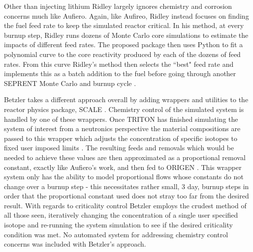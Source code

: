 Other than
injecting lithium Ridley largely ignores chemistry and corrosion concerns much
like Aufiero. Again, like Aufireo, Ridley instead focuses on finding the fuel
feed rate to keep the simulated reactor critical. In his method, at every
burnup step, Ridley runs dozens of Monte Carlo core simulations to estimate
the impacts of different feed rates. The proposed package then uses Python to
fit a polynomial curve to the core reactivity produced by each of the dozens
of feed rates. From this curve Ridley's method then selects the ``best" feed
rate and implements this as a batch addition to the fuel before going through
another SEPRENT Monte Carlo and burnup cycle \cite{Ridley}. 

Betzler takes a different approach overall by adding wrappers and utilities
to the reactor physics package, SCALE \cite{Betzler} \cite{SCALE}. 
Chemistry control of the simulated
system is handled by one of these wrappers. Once TRITON has finished simulating
the system of interest from a neutronics perspective the material compositions
are passed to this wrapper which adjusts the concentration of specific isotopes
to fixed user imposed limits \cite{TRITON}. 
The resulting feeds and removals which would be
needed to achieve these values are then approximated as a proportional removal
constant, exactly like Aufiero's work, and then fed to ORIGEN \cite{ORIGEN}.
 This wrapper
system only has the ability to model proportional flows whose constants do not
change over a burnup step - this necessitates rather small, 3 day, burnup steps
in order that the proportional constant used does not stray too far from the
desired result. With regards to criticality control Betzler employs the crudest
method of all those seen, iteratively changing the concentration of a single
user specified isotope and re-running the system simulation to see if the
desired criticality condition was met. No automated system for addressing
chemistry control concerns was included with Betzler's approach. 

